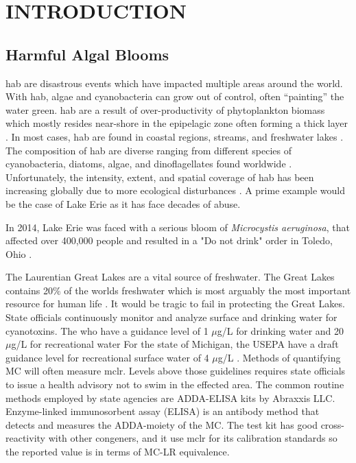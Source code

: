 
\chapter{INTRODUCTION}


\section{Harmful Algal Blooms}




\gls{hab} are disastrous events which have impacted multiple areas around the world. With \gls{hab}, algae and cyanobacteria can grow out of control, often ``painting'' the water green. \gls{hab} are a result of over-productivity of phytoplankton biomass which mostly resides near-shore in the epipelagic zone often forming a thick layer \cite{moore_richard_cyanobacterial_1993}.  In most cases, \gls{hab} are found in coastal regions, streams, and freshwater lakes \cite{rastogi_cyanotoxin-microcystins:_2014}. The composition of
\gls{hab} are diverse ranging from  different species of cyanobacteria, diatoms, algae, and dinoflagellates found worldwide \cite{dittmann_cyanobacterial_2012}.  Unfortunately, the intensity, extent, and spatial coverage of \gls{hab} has been increasing globally due to more ecological disturbances \cite{codd_cyanobacterial_1999}. A prime example would be the case of Lake Erie as it has face decades of abuse.

In 2014, Lake Erie was faced with a serious bloom of \emph{Microcystis aeruginosa}, that affected over 400,000 people and resulted in a "Do not drink" order in Toledo, Ohio \cite{mann_toledo_2014}.

The Laurentian Great Lakes are a vital source of freshwater. The Great Lakes contains 20\% of the worlds freshwater which is most arguably the most important resource for human life \cite{carmichael_health_2016}. It would be tragic to fail in protecting the Great Lakes.
State officials continuously monitor and analyze surface and drinking water for cyanotoxins. The \gls{who} have a guidance level of 1 $\mu$g/L for drinking water and 20 $\mu$g/L for recreational water \cite{world_health_organization_guidelines_2003} For the state of Michigan, the USEPA have a draft guidance level for recreational surface water of 4 $\mu$g/L \cite{usepa_draft_2016}. Methods of quantifying MC will often measure \gls{mclr}. Levels above those guidelines requires state officials to issue a health advisory not to swim in the effected area.  The common routine methods employed by state agencies are ADDA-ELISA kits by Abraxxis LLC. Enzyme-linked immunosorbent assay (ELISA) is an antibody method that detects and measures the ADDA-moiety of the MC.
The test kit has good cross-reactivity with other congeners, and it use \gls{mclr} for its calibration standards so the reported value is in terms of MC-LR equivalence.


